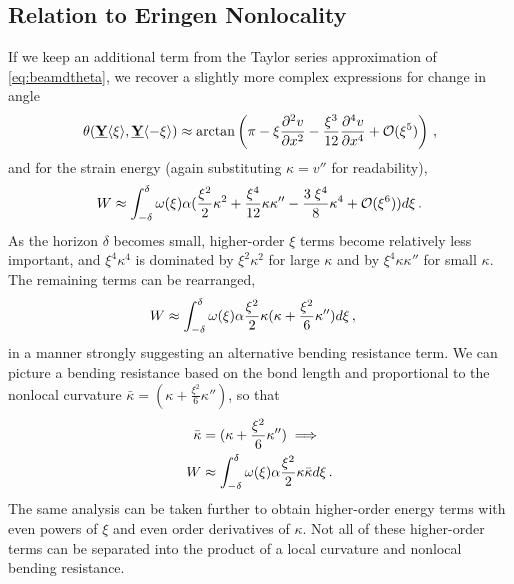 \subsection{Relation to Eringen Nonlocality}
\label{sec:EringenCompare}
If we keep an additional term from the Taylor series approximation of \cref{eq:beamdtheta}, we recover a slightly more complex expressions for change in angle
%
\begin{equation}
\label{eq:beamdthetaHOT}
\theta(\vstate{Y}{}{\xi},\vstate{Y}{}{\mathbf{-\xi}}) \approx \arctan\left(\pi-\xi \frac{\partial^2 v}{\partial x^2} -\frac{\xi^3}{12} \frac{\partial^4 v}{\partial x^4}  +\mathcal{O}(\xi^5)\right)\notag\, ,
\end{equation}
%
and for the strain energy (again substituting \(\kappa = v''\) for readability),
%
%
%
\begin{equation}
W \approx \int_{-\delta}^\delta \omega(\xi)\alpha(\frac{\xi^2}{2}\kappa^2+\frac{\xi^4}{12}\kappa\kappa''-\frac{3\; \xi^4}{8}\kappa^4+\mathcal{O}(\xi^6)) d\xi\, .\notag
\end{equation}
%
As the horizon \(\delta\) becomes small, higher-order \(\xi\) terms become relatively less important, and \(\xi^4\kappa^4\) is dominated by \(\xi^2\kappa^2\) for large \(\kappa\) and by \(\xi^4\kappa\kappa''\) for small \(\kappa\).
The remaining terms can be rearranged,
\begin{align}
W &\approx \int_{-\delta}^\delta \omega(\xi)\alpha \frac{\xi^2}{2}\kappa(\kappa + \frac{\xi^2}{6}\kappa'') d\xi\, , \notag
\end{align}
in a manner strongly suggesting an alternative bending resistance term.
We can picture a bending resistance based on the bond length and proportional to the nonlocal curvature  \(\bar{\kappa}=(\kappa + \frac{\xi^2}{6}\kappa'')\), so that 
%
\begin{align}
\label{eq:NLbending}
\bar{\kappa}&=(\kappa + \frac{\xi^2}{6}\kappa'') \implies  \\
W &\approx \int_{-\delta}^\delta \omega(\xi)\alpha \frac{\xi^2}{2}\kappa\bar{\kappa}d\xi\,  .\notag
\end{align}
%  
The same analysis can be taken further to obtain higher-order energy terms with even powers of \(\xi\) and even order derivatives of \(\kappa\). 
Not all of these higher-order terms can be separated into the product of a local curvature and nonlocal bending resistance.

